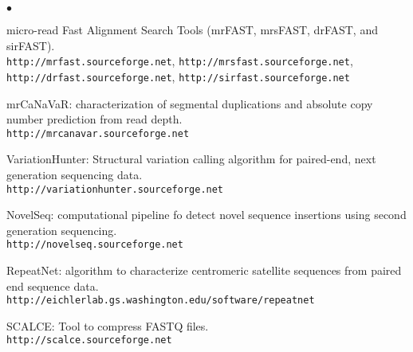 \documentclass[margin,line]{res}
\newenvironment{list2}{
  \begin{list}{$\bullet$}{%
      \setlength{\itemsep}{0in}
      \setlength{\parsep}{0in} \setlength{\parskip}{0in}
      \setlength{\topsep}{0in} \setlength{\partopsep}{0in} 
      \setlength{\leftmargin}{0.2in}}}{\end{list}}
\begin{document}
\begin{resume}
\begin{list2}
\item
  micro-read Fast Alignment Search Tools (mrFAST, mrsFAST, drFAST, and sirFAST).\\
  {\tt http://mrfast.sourceforge.net},
  {\tt http://mrsfast.sourceforge.net},
  {\tt http://drfast.sourceforge.net},  {\tt http://sirfast.sourceforge.net}
\item
  mrCaNaVaR: characterization of segmental duplications and absolute copy number prediction from read depth.\\
  {\tt http://mrcanavar.sourceforge.net}
\item
  VariationHunter: Structural variation calling algorithm for paired-end, next
  generation sequencing data.\\
  {\tt http://variationhunter.sourceforge.net}
\item
  NovelSeq: computational pipeline fo detect novel sequence insertions using second generation sequencing.\\
  {\tt http://novelseq.sourceforge.net}
\item
  RepeatNet: algorithm to characterize centromeric satellite sequences from paired end sequence data.\\
  {\tt http://eichlerlab.gs.washington.edu/software/repeatnet}
\item
  SCALCE: Tool to compress FASTQ files. \\
  {\tt http://scalce.sourceforge.net}
\end{list2}



\end{resume}
\end{document}
